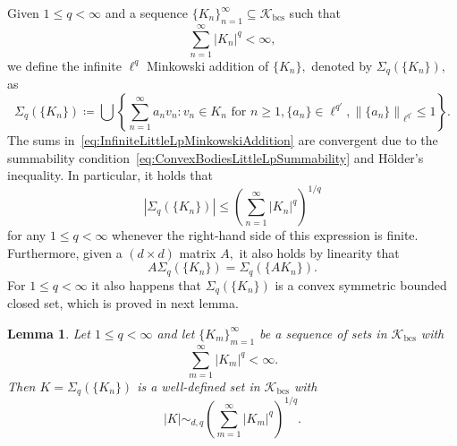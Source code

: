 \documentclass{article}
\newtheorem{lemma}[theorem]{Lemma}
\theoremstyle{definition}
\theoremstyle{remark}
\numberwithin{equation}{section}
\newcommand{\norm}[2]{\left\|{#1}\right\|_{{#2}}}
\newcommand{\cK}{\mathcal{K}}
\newcommand{\convex}{\cK_{\mathrm{bcs}}}
\newcommand{\lp}[1]{\ell^{#1}}
\newcommand{\1}{\mathbf{1}}
\begin{document}
    Given $1 \leq q < \infty$ and a sequence $\{K_n\}_{n=1}^\infty \subseteq \convex$ such that
    \begin{equation}
        \label{eq:ConvexBodiesLittleLpSummability}
        \sum_{n=1}^\infty |K_n|^q < \infty,
    \end{equation}
    we define the infinite $\lp{q}$ Minkowski addition of $\{K_n\},$ denoted by $\Sigma_{q} (\{K_n\}),$ as
    \begin{equation}
        \label{eq:InfiniteLittleLpMinkowskiAddition}
        \Sigma_{q}(\{K_n\}) \coloneq
        \bigcup \left\{\sum_{n=1}^\infty a_n v_n\colon v_n \in K_n \text{ for } n \geq 1, \{a_n\} \in \lp{q'}, \norm{\{a_n\}}{\lp{q'}} \leq 1 \right\}.
    \end{equation}
    The sums in~\eqref{eq:InfiniteLittleLpMinkowskiAddition} are convergent due to
    the summability condition~\eqref{eq:ConvexBodiesLittleLpSummability} and Hölder's inequality.
    In particular, it holds that
    \begin{equation*}
        \left|\Sigma_{q} (\{K_n\})\right| \leq \left(\sum_{n=1}^\infty |K_n|^q\right)^{1/q}
    \end{equation*}
    for any $1 \leq q < \infty$ whenever the right-hand side of this expression is finite.
    Furthermore, given a $(d \times d)$ matrix $A,$ it also holds by linearity that
    \begin{equation*}
        A \Sigma_q (\{K_n\}) = \Sigma_q (\{A K_n\}).
    \end{equation*}
    For $1 \leq q < \infty$ it also happens that $\Sigma_{q} (\{K_n\})$ is a convex symmetric bounded closed set,
    which is proved in next lemma.
    
    \begin{lemma}
        \label{lemma:LittleLqNormsConvexBody}
        Let $1\leq q<\infty$ and let $\{ K_{m}\}^{\infty}_{m=1}$ be a sequence of sets in $\convex$ with
        \begin{equation*}
            \sum_{m=1}^{\infty}|K_m|^{q}<\infty.
        \end{equation*}
        Then $K = \Sigma_{q} (\{K_n\})$
        is a well-defined set in $\convex$ with
        \begin{equation*}
            |K|\sim_{d,q}\left(\sum_{m=1}^{\infty}|K_m|^{q}\right)^{1/q}.
        \end{equation*}
    \end{lemma}
\end{document}
